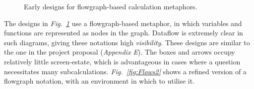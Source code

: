 \documentclass[12pt,twoside,notitlepage,xetex]{report}
\begin{document}
\begin{center}
\begin{figure}[H]
\begin{center}
\end{center}
\caption{Early designs for flowgraph-based calculation metaphors.}
\label{fig:Flows1}
\end{figure}
\end{center}

The designs in \emph{Fig.~\ref{fig:Flows1}} use a flowgraph-based metaphor, in which variables and functions are represented as nodes in the graph.  Dataflow is extremely clear in such diagrams, giving these notations high \emph{visibility}.  These designs are similar to the one in the project proposal (\emph{Appendix E}).  The boxes and arrows occupy relatively little screen-estate, which is advantageous in cases where a question necessitates many subcalculations.  \emph{Fig.~\ref{fig:Flows2}} shows a refined version of a flowgraph notation, with an environment in which to utilise it.
\end{document}
